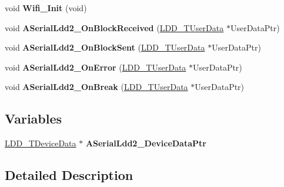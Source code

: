 \begin{DoxyCompactItemize}
\item 
\hypertarget{group___wifi__module_gaa445cc1280431eb6530c5aa904a181d8}{void {\bfseries Wifi\-\_\-\-Init} (void)}\label{group___wifi__module_gaa445cc1280431eb6530c5aa904a181d8}

\item 
\hypertarget{group___wifi__module_ga7a02cc6280b30d13707952d78f8e6c73}{void {\bfseries A\-Serial\-Ldd2\-\_\-\-On\-Block\-Received} (\hyperlink{group___p_e___types__module_ga0b66a73f87238a782318aa0be7578e35}{L\-D\-D\-\_\-\-T\-User\-Data} $\ast$User\-Data\-Ptr)}\label{group___wifi__module_ga7a02cc6280b30d13707952d78f8e6c73}

\item 
\hypertarget{group___wifi__module_ga723758484ee852a66a707036a9a38a92}{void {\bfseries A\-Serial\-Ldd2\-\_\-\-On\-Block\-Sent} (\hyperlink{group___p_e___types__module_ga0b66a73f87238a782318aa0be7578e35}{L\-D\-D\-\_\-\-T\-User\-Data} $\ast$User\-Data\-Ptr)}\label{group___wifi__module_ga723758484ee852a66a707036a9a38a92}

\item 
\hypertarget{group___wifi__module_ga145a063bdf852caee1c1b8adeb02fc77}{void {\bfseries A\-Serial\-Ldd2\-\_\-\-On\-Error} (\hyperlink{group___p_e___types__module_ga0b66a73f87238a782318aa0be7578e35}{L\-D\-D\-\_\-\-T\-User\-Data} $\ast$User\-Data\-Ptr)}\label{group___wifi__module_ga145a063bdf852caee1c1b8adeb02fc77}

\item 
\hypertarget{group___wifi__module_ga702765a2c9f1c0e914a6ca8484088ec5}{void {\bfseries A\-Serial\-Ldd2\-\_\-\-On\-Break} (\hyperlink{group___p_e___types__module_ga0b66a73f87238a782318aa0be7578e35}{L\-D\-D\-\_\-\-T\-User\-Data} $\ast$User\-Data\-Ptr)}\label{group___wifi__module_ga702765a2c9f1c0e914a6ca8484088ec5}

\end{DoxyCompactItemize}
\subsection*{Variables}
\begin{DoxyCompactItemize}
\item 
\hypertarget{group___wifi__module_gadee68051b76891befdaf56e3da755391}{\hyperlink{group___p_e___types__module_gac5cf1362f1f0e3a2ce71b1bf2276d091}{L\-D\-D\-\_\-\-T\-Device\-Data} $\ast$ {\bfseries A\-Serial\-Ldd2\-\_\-\-Device\-Data\-Ptr}}\label{group___wifi__module_gadee68051b76891befdaf56e3da755391}

\end{DoxyCompactItemize}


\subsection{Detailed Description}
